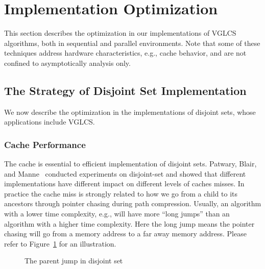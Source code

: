 \section{Implementation Optimization} \label{sec:Implementation}

This section describes the optimization in our implementations of VGLCS
algorithms, both in sequential and parallel environments.  Note that
some of these techniques address hardware characteristics, e.g., cache
behavior, and are not confined to asymptotically analysis only.

\subsection{The Strategy of Disjoint Set Implementation}

We now describe the optimization in the implementations of disjoint
sets, whose applications include VGLCS.


\subsubsection{Cache Performance}

The cache is essential to efficient implementation of disjoint sets.
Patwary, Blair, and Manne~\cite{Patwary2010ExperimentsOU} conducted
experiments on disjoint-set and showed that different implementations
have different impact on different levels of caches misses.  In
practice the cache miss is strongly related to how we go from a child
to its ancestors through pointer chasing during path compression.
Usually, an algorithm with a lower time complexity, e.g.,  will have more
``long jumps'' than an algorithm with a higher time complexity.  Here
the long jump means the pointer chasing will go from a memory address
to a far away memory address.  Please refer to
Figure~\ref{fig:long-short-jump-disjoint} for an illustration.

\begin{figure}[!thb]
  \centering {} 
  \caption{The parent jump in disjoint set}
  \label{fig:long-short-jump-disjoint}
\end{figure}

